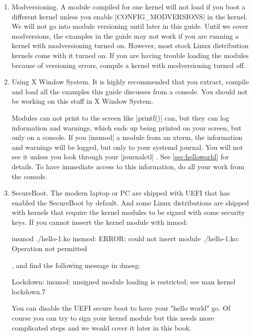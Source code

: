 \documentclass[10pt, oneside]{book}
\begin{document}
\begin{enumerate}
  \item Modversioning.
        A module compiled for one kernel will not load if you boot a different kernel unless you enable \cpp|CONFIG_MODVERSIONS| in the kernel.
        We will not go into module versioning until later in this guide.
        Until we cover modversions, the examples in the guide may not work if you are running a kernel with modversioning turned on.
        However, most stock Linux distribution kernels come with it turned on.
        If you are having trouble loading the modules because of versioning errors, compile a kernel with modversioning turned off.

  \item Using X Window System.
  \label{sec:using_x}
        It is highly recommended that you extract, compile and load all the examples this guide discusses from a console.
        You should not be working on this stuff in X Window System.

        Modules can not print to the screen like \cpp|printf()| can, but they can log information and warnings, which ends up being printed on your screen, but only on a console.
        If you \sh|insmod| a module from an xterm, the information and warnings will be logged, but only to your systemd journal.
        You will not see it unless you look through your \sh|journalctl| .
        See \ref{sec:helloworld} for details.
        To have immediate access to this information, do all your work from the console.

  \item SecureBoot.
        The modern laptop or PC are shipped with UEFI that has enabled the SecureBoot by default. And some Linux distributions are shipped with kernels that require the kernel modules to be signed with some security keys. If you cannot inssert the kernel module with inmod:

\begin{codebash}
insmod ./hello-1.ko
insmod: ERROR: could not insert module ./hello-1.ko: Operation not permitted
\end{codebash}
	, and find the following message in dmesg:
\begin{codebash}
Lockdown: insmod: unsigned module loading is restricted; see man kernel lockdown.7
\end{codebash}
	You can disable the UEFI secure boot to have your "hello world" go. Of course you can try to sign your kernel module but this needs more complicated steps and we would cover it later in this book.

\end{enumerate}
\end{document}
